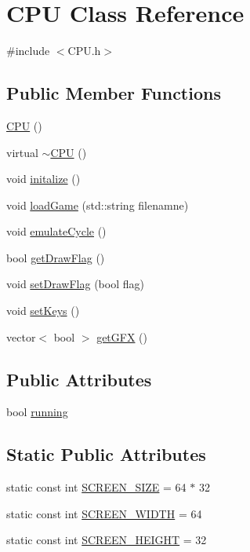 \hypertarget{classCPU}{\section{C\-P\-U Class Reference}
\label{classCPU}
}


{\ttfamily \#include $<$C\-P\-U.\-h$>$}

\subsection*{Public Member Functions}
\begin{DoxyCompactItemize}
\item 
\hyperlink{classCPU_a2fdd8153d0979ccad9ed8452897267f4}{C\-P\-U} ()
\item 
virtual \hyperlink{classCPU_aa32e0ed85bebabb167ace09050d20707}{$\sim$\-C\-P\-U} ()
\item 
void \hyperlink{classCPU_ad78f88b03032587507f0e48a58866560}{initalize} ()
\item 
void \hyperlink{classCPU_ad40d5c22c7df265ed603a33843fa3ee4}{load\-Game} (std\-::string filenamne)
\item 
void \hyperlink{classCPU_a039ffcdbd6bd2c41bd8362b6e546b0d8}{emulate\-Cycle} ()
\item 
bool \hyperlink{classCPU_a68658621a98bf997bfd736c9c64f3fac}{get\-Draw\-Flag} ()
\item 
void \hyperlink{classCPU_a9356ef4051a2badfa3ff8a8baa8f3dc4}{set\-Draw\-Flag} (bool flag)
\item 
void \hyperlink{classCPU_a9bbdc09cee677e45c26214fb731e0620}{set\-Keys} ()
\item 
vector$<$ bool $>$ \hyperlink{classCPU_a78bc6d2d338b4b7cf134a547544c8327}{get\-G\-F\-X} ()
\end{DoxyCompactItemize}
\subsection*{Public Attributes}
\begin{DoxyCompactItemize}
\item 
bool \hyperlink{classCPU_ac13fd4e7e628ad487d6b7c9573c51a09}{running}
\end{DoxyCompactItemize}
\subsection*{Static Public Attributes}
\begin{DoxyCompactItemize}
\item 
static const int \hyperlink{classCPU_a06c3d3ec8c47f48c437256e8910840a1}{S\-C\-R\-E\-E\-N\-\_\-\-S\-I\-Z\-E} = 64 $\ast$ 32
\item 
static const int \hyperlink{classCPU_a8feada83f7887e1a418c4dd308fbd4a9}{S\-C\-R\-E\-E\-N\-\_\-\-W\-I\-D\-T\-H} = 64
\item 
static const int \hyperlink{classCPU_a0c73376f8f7ed2cdcdc97967433e23b7}{S\-C\-R\-E\-E\-N\-\_\-\-H\-E\-I\-G\-H\-T} = 32
\end{DoxyCompactItemize}
